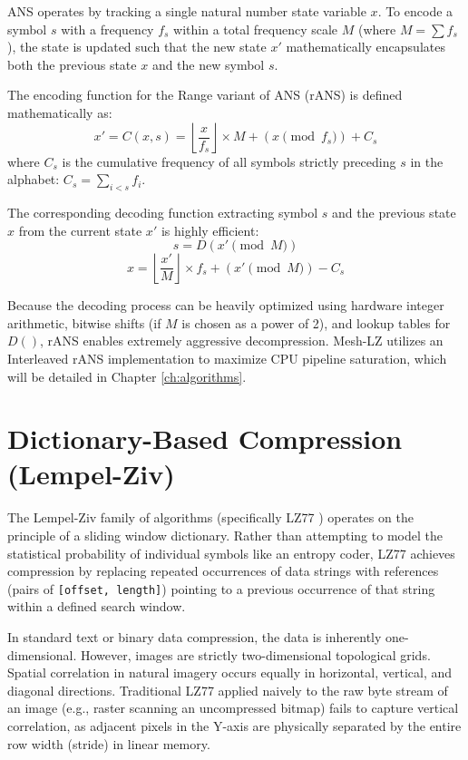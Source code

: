 ANS operates by tracking a single natural number state variable $x$. To encode a symbol $s$ with a frequency $f_s$ within a total frequency scale $M$ (where $M = \sum f_s$), the state is updated such that the new state $x'$ mathematically encapsulates both the previous state $x$ and the new symbol $s$.

The encoding function for the Range variant of ANS (rANS) is defined mathematically as:
\begin{equation}
    x' = C(x, s) = \left\lfloor \frac{x}{f_s} \right\rfloor \times M + (x \pmod{f_s}) + C_s
\end{equation}
where $C_s$ is the cumulative frequency of all symbols strictly preceding $s$ in the alphabet: $C_s = \sum_{i < s} f_i$.

The corresponding decoding function extracting symbol $s$ and the previous state $x$ from the current state $x'$ is highly efficient:
\begin{equation}
    s = D(x' \pmod{M})
\end{equation}
\begin{equation}
    x = \left\lfloor \frac{x'}{M} \right\rfloor \times f_s + (x' \pmod{M}) - C_s
\end{equation}

Because the decoding process can be heavily optimized using hardware integer arithmetic, bitwise shifts (if $M$ is chosen as a power of 2), and lookup tables for $D()$, rANS enables extremely aggressive decompression. Mesh-LZ utilizes an Interleaved rANS implementation to maximize CPU pipeline saturation, which will be detailed in Chapter \ref{ch:algorithms}.

\section{Dictionary-Based Compression (Lempel-Ziv)}

The Lempel-Ziv family of algorithms (specifically LZ77 \cite{ziv1977universal}) operates on the principle of a sliding window dictionary. Rather than attempting to model the statistical probability of individual symbols like an entropy coder, LZ77 achieves compression by replacing repeated occurrences of data strings with references (pairs of \texttt{[offset, length]}) pointing to a previous occurrence of that string within a defined search window.

In standard text or binary data compression, the data is inherently one-dimensional. However, images are strictly two-dimensional topological grids. Spatial correlation in natural imagery occurs equally in horizontal, vertical, and diagonal directions. Traditional LZ77 applied naively to the raw byte stream of an image (e.g., raster scanning an uncompressed bitmap) fails to capture vertical correlation, as adjacent pixels in the Y-axis are physically separated by the entire row width (stride) in linear memory. 

